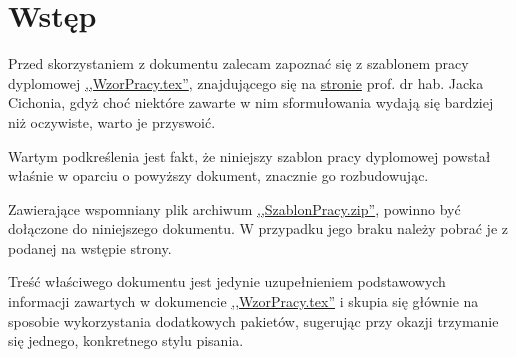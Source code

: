 \chapter{Wstęp}
\thispagestyle{chapterBeginStyle}


Przed skorzystaniem z dokumentu zalecam zapoznać się z szablonem pracy dyplomowej \href{http://prac.im.pwr.wroc.pl/~cichon/MaterialyDydaktyczne/PracDypl.zip}{,,WzorPracy.tex''}, znajdującego się na \href{http://prac.im.pwr.wroc.pl/~cichon/thesis.php}{stronie} prof. dr hab. Jacka Cichonia, gdyż choć niektóre zawarte w nim sformułowania wydają się bardziej niż oczywiste, warto je przyswoić.

Wartym podkreślenia jest fakt, że niniejszy szablon pracy dyplomowej powstał właśnie w oparciu o powyższy dokument, znacznie go rozbudowując.

Zawierające wspomniany plik archiwum \href{SzablonPracy.zip}{,,SzablonPracy.zip''}, powinno być dołączone do niniejszego dokumentu.
W przypadku jego braku należy pobrać je z podanej na wstępie strony.

Treść właściwego dokumentu jest jedynie uzupełnieniem podstawowych informacji zawartych w dokumencie \href{http://prac.im.pwr.wroc.pl/~cichon/MaterialyDydaktyczne/PracDypl.zip}{,,WzorPracy.tex''} i skupia się głównie na sposobie wykorzystania dodatkowych pakietów, sugerując przy okazji trzymanie się jednego, konkretnego stylu pisania.